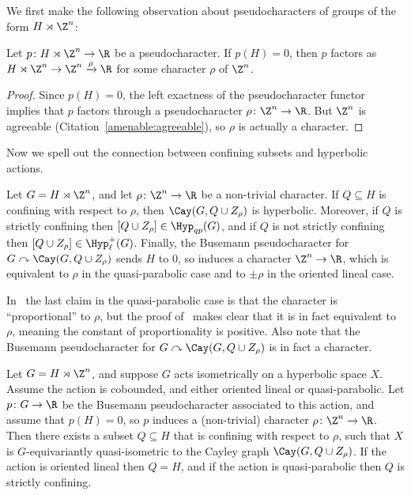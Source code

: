 We first make the following observation about pseudocharacters of groups of the form $H \rtimes \Z^n$:

\begin{lemm}
\label{lem:factor}
Let $p \colon H \rtimes \Z^n \to \R$ be a pseudocharacter. If $p(H) = 0$, then $p$ factors as $H \rtimes \Z^n \to \Z^n \xrightarrow{\rho} \R$ for some character $\rho$ of $\Z^n$.
\end{lemm}

\begin{proof}
Since $p(H) = 0$, the left exactness of the pseudocharacter functor~\cite[Remark 2.90]{scl} implies that $p$ factors through a pseudocharacter $\rho \colon \Z^n \to \R$. But $\Z^n$ is agreeable (Citation~\ref{amenable:agreeable}), so $\rho$ is actually a character.
\end{proof}

Now we spell out the connection between confining subsets and hyperbolic actions.

\begin{cit}\label{cit:confining_to_action}
Let $G=H\rtimes \Z^n$, and let $\rho\colon \Z^n\to \R$ be a non-trivial character. If $Q\subseteq H$ is confining with respect to $\rho$, then $\Cay(G,Q\cup Z_\rho)$ is hyperbolic. Moreover, if $Q$ is strictly confining then $[Q\cup Z_\rho]\in \Hyp_{qp}(G)$, and if $Q$ is not strictly confining then $[Q\cup Z_\rho]\in \Hyp_\ell^+(G)$. Finally, the Busemann pseudocharacter for $G\curvearrowright \Cay(G,Q\cup Z_\rho)$ sends $H$ to $0$, so induces a character $\Z^n\to\R$, which is equivalent to $\rho$ in the quasi-parabolic case and to $\pm\rho$ in the oriented lineal case.
\end{cit}

In~\cite[Theorem~1.1]{confining} the last claim in the quasi-parabolic case is that the character is ``proportional'' to $\rho$, but the proof of~\cite[Lemma~1.1]{confining} makes clear that it is in fact equivalent to $\rho$, meaning the constant of proportionality is positive. Also note that the Busemann pseudocharacter for $G\curvearrowright \Cay(G,Q\cup Z_\rho)$ is in fact a character.

\begin{cit}
\label{cit:action_to_confining}
Let $G=H\rtimes \Z^n$, and suppose $G$ acts isometrically on a hyperbolic space $X$. Assume the action is cobounded, and either oriented lineal or quasi-parabolic. Let $p\colon G\to\R$ be the Busemann pseudocharacter associated to this action, and assume that $p(H)=0$, so $p$ induces a (non-trivial) character $\rho\colon \Z^n\to\R$. Then there exists a subset $Q\subseteq H$ that is confining with respect to $\rho$, such that $X$ is $G$-equivariantly quasi-isometric to the Cayley graph $\Cay(G,Q\cup Z_\rho)$. If the action is oriented lineal then $Q=H$, and if the action is quasi-parabolic then $Q$ is strictly confining.
\end{cit}

